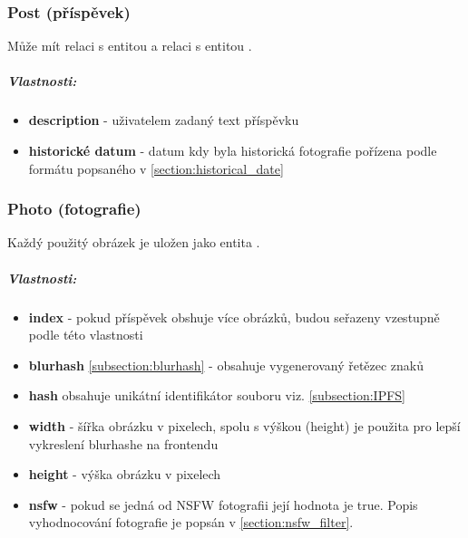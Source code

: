 \documentclass[12pt, a4paper,
 twoside,        %
 openright
]{report}
\newenvironment{propertiesItemize}{
  \begin{itemize}  \begin{itemize}{ 
  }}
  {\end{itemize}\end{itemize}}
\begin{document}
    	            \subsubsection{Post (příspěvek)}  Může mít relaci  s entitou  a relaci  s entitou .
                          \subparagraph{Vlastnosti:}
 \begin{propertiesItemize}
                                \item \textbf{description} - uživatelem zadaný text příspěvku 
                                \item \textbf{historické datum} - datum kdy byla historická fotografie pořízena podle formátu popsaného v \ref{section:historical_date}
\end{propertiesItemize}
    	            \subsubsection{Photo (fotografie)} Každý použitý obrázek je uložen jako entita .
	                    \subparagraph{Vlastnosti:}  
                           \begin{propertiesItemize}
                                \item \textbf{index} - pokud příspěvek obshuje více obrázků, budou seřazeny vzestupně podle této vlastnosti
                                \item \textbf{blurhash} \ref{subsection:blurhash} - obsahuje vygenerovaný řetězec znaků
                                \item \textbf{hash} obsahuje unikátní identifikátor souboru viz. \ref{subsection:IPFS}
                                \item \textbf{width} - šířka obrázku v pixelech, spolu s výškou (height) je použita pro lepší vykreslení blurhashe na frontendu 
                                \item \textbf{height} - výška obrázku v pixelech
                                \item \textbf{nsfw} - pokud se jedná od NSFW fotografii její hodnota je true. Popis vyhodnocování fotografie je popsán v \ref{section:nsfw_filter}.
                        \end{propertiesItemize}
\end{document}
